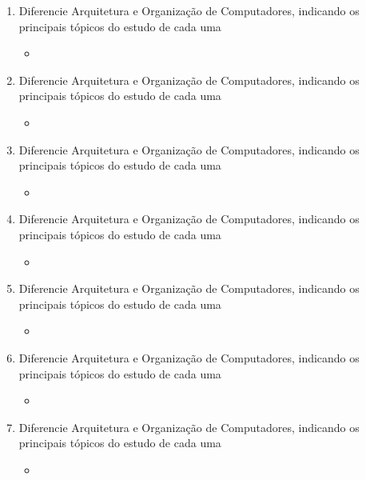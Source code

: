 \documentclass[12pt]{article}
\begin{document}
\begin{enumerate}
    principais tópicos do estudo de cada uma
    \begin{itemize}[label=R:]
        \item 
    \end{itemize}
    \item Diferencie Arquitetura e Organização de Computadores, indicando os 
    principais tópicos do estudo de cada uma
    \begin{itemize}[label=R:]
        \item 
    \end{itemize}
    \item Diferencie Arquitetura e Organização de Computadores, indicando os 
    principais tópicos do estudo de cada uma
    \begin{itemize}[label=R:]
        \item 
    \end{itemize}
    \item Diferencie Arquitetura e Organização de Computadores, indicando os 
    principais tópicos do estudo de cada uma
    \begin{itemize}[label=R:]
        \item 
    \end{itemize}
    \item Diferencie Arquitetura e Organização de Computadores, indicando os 
    principais tópicos do estudo de cada uma
    \begin{itemize}[label=R:]
        \item 
    \end{itemize}
    \item Diferencie Arquitetura e Organização de Computadores, indicando os 
    principais tópicos do estudo de cada uma
    \begin{itemize}[label=R:]
        \item 
    \end{itemize}
    \item Diferencie Arquitetura e Organização de Computadores, indicando os 
    principais tópicos do estudo de cada uma
    \begin{itemize}[label=R:]
        \item 
    \end{itemize}
    \item Diferencie Arquitetura e Organização de Computadores, indicando os 
    principais tópicos do estudo de cada uma
    \begin{itemize}[label=R:]
        \item 
    \end{itemize}

\end{enumerate}
\end{document}
